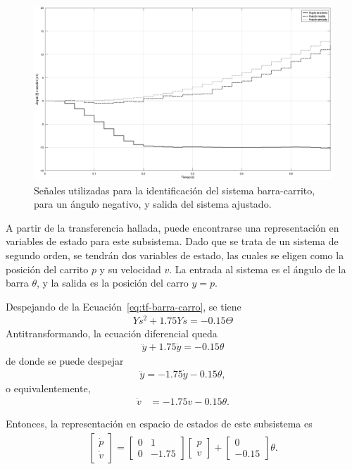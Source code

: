 \begin{figure}[!htbp]
    \centering
    \includegraphics[width=\linewidth]{img/ident-carrito2.eps}
    \caption{Señales utilizadas para la identificación del sistema barra-carrito, para un ángulo negativo, y salida del sistema ajustado.}
    \label{fig:ident-carro2}
\end{figure}

A partir de la transferencia hallada, puede encontrarse una representación en variables de estado para este subsistema. Dado que se trata de un sistema de segundo orden, se tendrán dos variables de estado, las cuales se eligen como la posición del carrito $p$ y su velocidad $v$. La entrada al sistema es el ángulo de la barra $\theta$, y la salida es la posición del carro $y = p$.

Despejando de la Ecuación~\eqref{eq:tf-barra-carro}, se tiene
\begin{align*}
    Ys^{2} + 1.75 Y s = -0.15 \Theta
\end{align*}
Antitransformando, la ecuación diferencial queda
\begin{align*}
    \ddot{y} + 1.75 \dot{y} = -0.15 \theta
\end{align*}
de donde se puede despejar
\begin{align*}
    \ddot{y} = -1.75 \dot{y} - 0.15 \theta,
\end{align*}
o equivalentemente,
\begin{align*}
    \dot{v} &= -1.75 v - 0.15 \theta.
\end{align*}

Entonces, la representación en espacio de estados de este subsistema es
\begin{align*}
    \begin{bmatrix} \dot{p} \\ \dot{v} \end{bmatrix} =
        \begin{bmatrix} 0 & 1 \\ 0 & -1.75 \end{bmatrix} \begin{bmatrix} p \\ v \end{bmatrix}
        + \begin{bmatrix} 0 \\ - 0.15 \end{bmatrix} \theta.
\end{align*}

